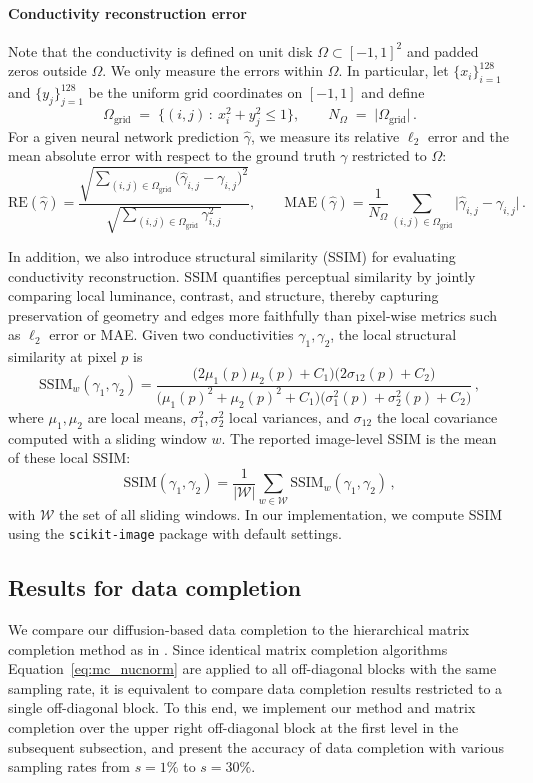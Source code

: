 \documentclass{article}
\def\Eqref#1{Equation~\ref{#1}}
\begin{document}
\paragraph{Conductivity reconstruction error}
Note that the conductivity is defined on unit disk $\Omega \subset [-1,1]^2$ and padded zeros outside $\Omega$. We only measure the errors within $\Omega$. In particular, let \(\{x_i\}_{i=1}^{128}\) and \(\{y_j\}_{j=1}^{128}\) be the uniform grid coordinates on \([-1,1]\) and define
\[
\Omega_{\mathrm{grid}} \;=\; \bigl\{(i,j)\,:\ x_i^2 + y_j^2 \le 1 \bigr\},
\qquad
N_\Omega \;=\; \lvert \Omega_{\mathrm{grid}}\rvert\,.
\]
For a given neural network prediction $\hat{\gamma}$, we measure its  relative \(\ell_2\) error and the mean absolute error with respect to the ground truth $\gamma$ restricted to \(\Omega\):
\[
\mathrm{RE}\!\left(\hat{\gamma}\right)
= \frac{\displaystyle\sqrt{\sum_{(i,j)\in \Omega_{\mathrm{grid}}}\bigl(\hat{\gamma}_{i,j}-\gamma_{i,j}\bigr)^2}}
       {\displaystyle \sqrt{\sum_{(i,j)\in \Omega_{\mathrm{grid}}} \gamma_{i,j}^2}}, 
\qquad
\mathrm{MAE}\!\left(\hat{\gamma}\right)
= \frac{1}{N_\Omega}\sum_{(i,j)\in \Omega_{\mathrm{grid}}}\bigl|\hat{\gamma}_{i,j}-\gamma_{i,j}\bigr|\,.
\]

In addition, we also introduce structural similarity (SSIM) for evaluating conductivity reconstruction.
SSIM quantifies perceptual similarity by jointly comparing local luminance, contrast, and structure, thereby capturing preservation of geometry and edges more faithfully than pixel-wise metrics such as $\ell_2$ error or MAE.
Given two conductivities \(\gamma_{1},\gamma_2 \), the local structural similarity at pixel \(p\) is
\[
\mathrm{SSIM}_w(\gamma_1,\gamma_2)=
\frac{\bigl(2\mu_1(p)\mu_2(p)+C_1\bigr)\bigl(2\sigma_{12}(p)+C_2\bigr)}
     {\bigl(\mu_1(p)^2+\mu_2(p)^2+C_1\bigr)\bigl(\sigma_1^2(p)+\sigma_2^2(p)+C_2\bigr)}\,,
\]
where \(\mu_1,\mu_2\) are local means, \(\sigma_1^2,\sigma_2^2\) local variances, and \(\sigma_{12}\) the local covariance computed with a sliding window $w$. 
The reported image-level SSIM is the mean of these local SSIM:
\[
\mathrm{SSIM}(\gamma_1,\gamma_2)=\frac{1}{|\mathcal{W}|}\sum_{w\in\mathcal{W}}\mathrm{SSIM}_w(\gamma_1,\gamma_2)\,,
\]
with $\mathcal{W}$ the set of all sliding windows. In our implementation, we compute SSIM using the \texttt{scikit-image} package \citep{van2014scikit} with default settings.

\subsection{Results for data completion}\label{sec:result_DC}
We compare our diffusion-based data completion to the hierarchical matrix completion method as in \citet{bui2022bridging}. Since identical matrix completion algorithms \Eqref{eq:mc_nucnorm} are applied to all off-diagonal blocks with the same sampling rate, it is equivalent to compare data completion results restricted to a single off-diagonal block.
To this end, we implement our method and matrix completion over the upper right off-diagonal block at the first level in the subsequent subsection, and present the accuracy of data completion with various sampling rates from $s=1\%$ to $s=30\%$.
\end{document}
